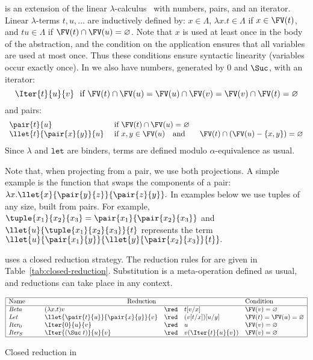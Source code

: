 \documentclass{article}
\begin{document}
 \LLCI is an extension of the linear
$\lambda$-calculus~\cite{AbramskyS:comill} with numbers, pairs, and an
iterator. Linear $\lambda$-terms $t,u, \ldots$ are inductively defined
by: $x \in \Lambda$, $\lambda x.t \in \Lambda$ if $x \in \FV(t)$, and
$tu \in \Lambda$ if $\FV(t) \cap \FV(u) = \varnothing$.  Note that $x$
is used at least once in the body of the abstraction, and the
condition on the application ensures that all variables are used at
most once. Thus these conditions ensure syntactic linearity (variables
occur exactly once).  In \LLCI we also have numbers, generated by $0$
and $\Suc$, with an iterator:
\[
\Iter{t}{u}{v} ~~ \mbox{if $\FV(t) \cap \FV(u) = \FV(u)\cap \FV(v) =
\FV(v)\cap\FV(t)= \varnothing$} 
\]
and pairs:
\[
\begin{array}{lll}
\pair{t}{u} &  ~ \mbox{if $\FV(t) \cap \FV(u) = \varnothing$}\\
\llet{t}{\pair{x}{y}}{u} & ~ \mbox{if $x,y \in \FV(u)$\ \ \ and}&  ~ \FV(t) \cap (\FV(u) - \{x,y\}) = \varnothing
\end{array}
\]
Since $\lambda$ and $\mathtt{let}$ are binders, terms are defined modulo
$\alpha$-equivalence as usual. 

Note that, when projecting from a pair, we use both projections. A
simple example is the function that swaps the
components of a pair: 
$
\lambda x.\llet{x}{\pair{y}{z}}{\pair{z}{y}}.
$
In examples below we use tuples of any size, built from pairs. For example, 
$\tuple{x_1}{x_2}{x_3} = \pair{x_1}{\pair{x_2}{x_3}}$ and
\(
\llet{u}{\tuple{x_1}{x_2}{x_3}}{t}
\)
represents the term $\llet{u}{\pair{x_1}{y}}{\llet{y}{\pair{x_2}{x_3}}{t}}.$



\LLCI uses a closed reduction strategy. The reduction rules for \LLCI are given in
Table~\ref{tab:closed-reduction}.  Substitution is a meta-operation
defined as usual, and reductions can take place in any context. 


\begin{table*}[ht]
\[
\begin{array}{|llcll|}\hline
\mbox{Name}\qquad&\multicolumn{3}{c}{\mbox{Reduction}}& \mbox{Condition} \\ \hline
\emph{Beta}&(\lambda x.t)v &\red& t[v/x] & \FV(v) = \varnothing \\
\emph{Let} & \llet{\pair{t}{u}}{\pair{x}{y}}{v} &\red& (v[t/x])[u/y] &
\FV(t) = \FV(u) = \varnothing \\
\emph{Iter}_0 &\Iter{0}{u}{v} &\red& u & \FV(v) = \varnothing \\ 
\emph{Iter}_S&\Iter{(\Suc\;t)}{u}{v} &\red& v(\Iter{t}{u}{v}) & \FV(v) = \varnothing \\
\hline
\end{array}
\]
\caption{Closed reduction in \LLCI}\label{tab:closed-reduction}
\end{table*}
\end{document}
